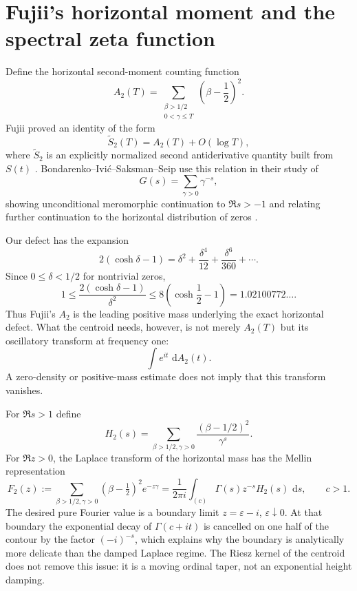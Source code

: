 \documentclass[11pt]{amsart}
\numberwithin{equation}{section}
\theoremstyle{definition}
\theoremstyle{remark}
\newcommand{\dd}{\,\mathrm d}
\begin{document}
\section{Fujii's horizontal moment and the spectral zeta function}\label{sec:fujii}

Define the horizontal second-moment counting function
\begin{equation}\label{eq:A2}
A_2(T)=
\sum_{\substack{\beta>1/2\\0<\gamma\le T}}
\left(\beta-\frac12\right)^2.
\end{equation}
Fujii proved an identity of the form
\begin{equation}\label{eq:Fujii}
\widetilde S_2(T)=A_2(T)+O(\log T),
\end{equation}
where $\widetilde S_2$ is an explicitly normalized second antiderivative quantity built from $S(t)$ \cite{Fujii2002}.  Bondarenko--Ivić--Saksman--Seip use this relation in their study of
\[
G(s)=\sum_{\gamma>0}\gamma^{-s},
\]
showing unconditional meromorphic continuation to $\Re s>-1$ and relating further continuation to the horizontal distribution of zeros \cite{BondarenkoIvicSaksmanSeip2019}.

Our defect has the expansion
\[
2(\cosh\delta-1)
=\delta^2+\frac{\delta^4}{12}+\frac{\delta^6}{360}+\cdots.
\]
Since $0\le\delta<1/2$ for nontrivial zeros,
\[
1\le
\frac{2(\cosh\delta-1)}{\delta^2}
\le 8\left(\cosh\frac12-1\right)
=1.02100772\ldots.
\]
Thus Fujii's $A_2$ is the leading positive mass underlying the exact horizontal defect.  What the centroid needs, however, is not merely $A_2(T)$ but its oscillatory transform at frequency one:
\[
\int e^{it}\,\dd A_2(t).
\]
A zero-density or positive-mass estimate does not imply that this transform vanishes.

For $\Re s>1$ define
\[
H_2(s)=\sum_{\beta>1/2,\gamma>0}
\frac{(\beta-1/2)^2}{\gamma^s}.
\]
For $\Re z>0$, the Laplace transform of the horizontal mass has the Mellin representation
\begin{equation}\label{eq:MellinFujii}
F_2(z)
:=\sum_{\beta>1/2,\gamma>0}(\beta-\tfrac12)^2e^{-z\gamma}
=\frac1{2\pi i}\int_{(c)}\Gamma(s)z^{-s}H_2(s)\,\dd s,
\qquad c>1.
\end{equation}
The desired pure Fourier value is a boundary limit $z=\varepsilon-i$, $\varepsilon\downarrow0$.  At that boundary the exponential decay of $\Gamma(c+it)$ is cancelled on one half of the contour by the factor $(-i)^{-s}$, which explains why the boundary is analytically more delicate than the damped Laplace regime.  The Riesz kernel of the centroid does not remove this issue: it is a moving ordinal taper, not an exponential height damping.
\end{document}
